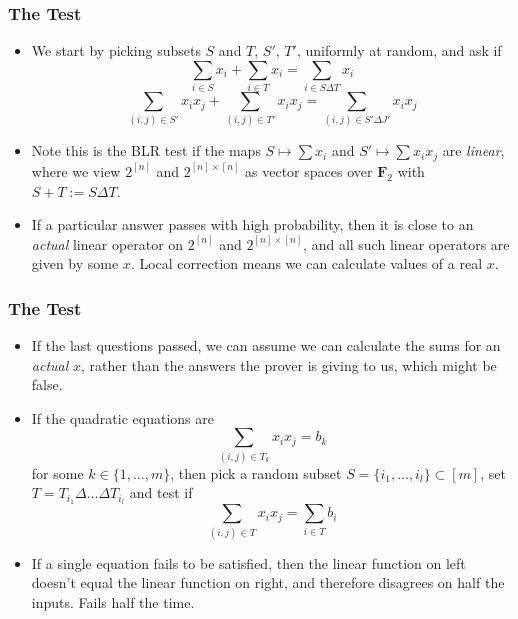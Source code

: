 \documentclass{beamer}
\begin{document}
\begin{frame}
    \frametitle{The Test}

    \begin{itemize}
            \item<1-> We start by picking subsets $S$ and $T$, $S'$, $T'$, uniformly at random, and ask if
        \[ \sum_{i \in S} x_i + \sum_{i \in T} x_i = \sum_{i \in S \Delta T} x_i \]
        \[ \sum_{(i,j) \in S'} x_ix_j + \sum_{(i,j) \in T'} x_ix_j = \sum_{(i,j) \in S' \Delta J'} x_ix_j \]

        \item<2-> Note this is the BLR test if the maps $S \mapsto \sum x_i$ and $S' \mapsto \sum x_ix_j$ are {\it linear}, where we view $2^{[n]}$ and $2^{[n] \times [n]}$ as vector spaces over $\mathbf{F}_2$ with $S + T := S \Delta T$.

        \item<3-> If a particular answer passes with high probability, then it is close to an {\it actual} linear operator on $2^{[n]}$ and $2^{[n] \times [n]}$, and all such linear operators are given by some $x$. Local correction means we can calculate values of a real $x$.
    \end{itemize}
\end{frame}

\begin{frame}
    \frametitle{The Test}

    \begin{itemize}
        \item<1-> If the last questions passed, we can assume we can calculate the sums for an {\it actual} $x$, rather than the answers the prover is giving to us, which might be false.

        \item<2-> If the quadratic equations are
        \[ \sum_{(i,j) \in T_k} x_ix_j = b_k \]
        for some $k \in \{ 1, \dots, m \}$, then pick a random subset $S = \{ i_1, \dots, i_l \} \subset [m]$, set $T = T_{i_1} \Delta \dots \Delta T_{i_l}$ and test if
        \[ \sum_{(i,j) \in T} x_ix_j = \sum_{i \in T} b_i \]

        \item <3-> If a single equation fails to be satisfied, then the linear function on left doesn't equal the linear function on right, and therefore disagrees on half the inputs. Fails half the time.
    \end{itemize}
\end{frame}
\end{document}
